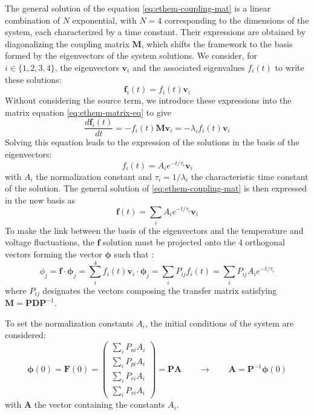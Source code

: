 The general solution of the equation \ref{eq:ethem-coupling-mat} is a linear combination of $N$ exponential, with $N=4$ corresponding to the dimensions of the system, each characterized by a time constant. Their expressions are obtained by diagonalizing the coupling matrix $\bm{M}$, which shifts the framework to the basis formed by the eigenvectors of the system solutions. We consider, for $i \in \{1,2,3,4\}$, the eigenvectors $\bm{v}_i$ and the associated eigenvalues $f_i(t)$ to write these solutions:
\begin{equation}
\label{eq:eigen-solution}
\bm{f}_i(t) = f_i(t) \bm{v}_i
\end{equation}
Without considering the source term, we introduce these expressions into the matrix equation \ref{eq:ethem-matrix-eq} to give
\begin{equation}
\label{eq:eigen-solution-ode}
\frac{d \bm{f}_i(t)}{d t} = -f_i(t) \bm{M} \bm{v}_i = -\lambda_i f_i(t) \bm{v}_i
\end{equation}
Solving this equation leads to the expression of the solutions in the basis of the eigenvectors:
\begin{equation}
f_i(t) = A_i e^{-t/\tau_i} \bm{v}_i
\end{equation}
with $A_i$ the normalization constant and $\tau_i=1/\lambda_i$ the characteristic time constant of the solution. The general solution of \ref{eq:ethem-coupling-mat} is then expressed in the new basis as
\begin{equation}
\label{eq:eigein-solution-expr}
\bm{f}(t) = \sum_i A_i e^{-t/\tau_i} \bm{v}_i
\end{equation}
To make the link between the basis of the eigenvectors and the temperature and voltage fluctuations, the $\bm{f}$ solution must be projected onto the 4 orthogonal vectors forming the vector $\bm{\phi}$ such that :
\begin{equation}
\label{eq:gen-solution}
\phi_j = \bm{f} \cdot \bm{\phi}_j = \sum_i^4 f_i(t) \bm{v}_i \cdot \bm{\phi}_j = \sum_i P_{ij} f_i(t) = \sum_i P_{ij} A_i e^{-t/\tau_i}
\end{equation}
where $P_{ij}$ designates the vectors composing the transfer matrix satisfying $\bm{M}=\bm{P} \bm{D} \bm{P}^{-1}$.

To set the normalization constants $A_i$, the initial conditions of the system are considered:
\begin{equation}
\bm{\phi}(0) = \bm{F}(0) =
\left( \begin{array}{c}
\sum_i P_{ai} A_i\\
\sum_i P_{pi} A_i\\
\sum_i P_{ei} A_i\\
\sum_i P_{vi} A_i
\end{array} \right) = \bm{P} \bm{A}
\qquad \longrightarrow \qquad \bm{A}=\bm{P}^{-1} \bm{\phi} (0)
\label{eq:ethem-initial-value}
\end{equation}
with $\bm{A}$ the vector containing the constants $A_i$.

